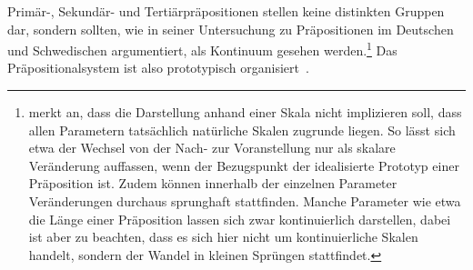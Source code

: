 Prim{\"a}r-, Sekund{\"a}r- und Tertiärpr{\"a}positionen stellen keine distinkten Gruppen dar, sondern sollten, wie \citet[261]{Lindqvist1994} in seiner Untersuchung zu Präpositionen im Deutschen und Schwedischen argumentiert, als Kontinuum gesehen werden.\footnote{\citet[18--21]{Lindqvist1994} merkt an, dass die Darstellung anhand einer Skala nicht implizieren soll, dass allen Parametern tats{\"a}chlich nat{\"u}rliche Skalen zugrunde liegen. 
So l{\"a}sst sich etwa der Wechsel von der Nach- zur Voranstellung nur als skalare Ver{\"a}nderung auffassen, wenn der Bezugspunkt der idealisierte Prototyp einer Präposition ist.
Zudem können innerhalb der einzelnen Parameter Ver{\"a}nderungen durchaus sprunghaft stattfinden. Manche Parameter wie etwa die L{\"a}nge einer Pr{\"a}position lassen sich zwar kontinuierlich darstellen, dabei ist aber zu beachten, dass es sich hier nicht um kontinuierliche Skalen handelt, sondern der Wandel in kleinen Spr{\"u}ngen stattfindet.}
Das Pr{\"a}positionalsystem ist also prototypisch organisiert~\citep[s.][33--34]{Bene.1975}. 

